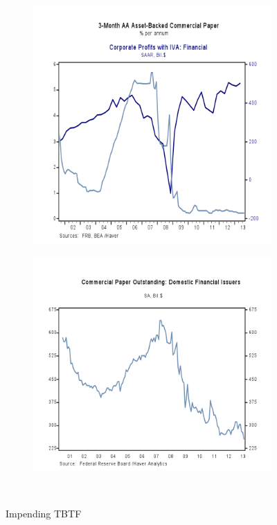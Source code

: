 \begin{figure}[H]
\begin{subfigure}{.30\textwidth}
  \includegraphics[width=1\linewidth]{figure/HugeRedFlag.png}
  \caption*{}
  \label{fig:corp}
\end{subfigure}%
\begin{subfigure}{.35\textwidth}
  \centering
  \includegraphics[width=1\linewidth]{figure/DomesticFinancial_CommPaper.png}
  \caption*{}
  \label{fig:muni}
\end{subfigure}\\[-1cm]
\caption{Impending TBTF}
\label{fig:TBTF}
\end{figure}

